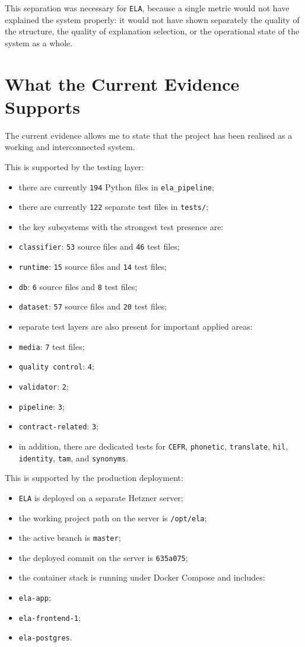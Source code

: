 \documentclass[12pt,a4paper,oneside]{report}
\begin{document}
This separation was necessary for \texttt{ELA}, because a single metric would not have explained the system properly: it would not have shown separately the quality of the structure, the quality of explanation selection, or the operational state of the system as a whole.

\section{What the Current Evidence Supports}
The current evidence allows me to state that the project has been realised as a working and interconnected system.

This is supported by the testing layer:
\begin{itemize}
  \item there are currently \texttt{194} Python files in \texttt{ela\_pipeline};
  \item there are currently \texttt{122} separate test files in \texttt{tests/};
  \item the key subsystems with the strongest test presence are:
  \item \texttt{classifier}: \texttt{53} source files and \texttt{46} test files;
  \item \texttt{runtime}: \texttt{15} source files and \texttt{14} test files;
  \item \texttt{db}: \texttt{6} source files and \texttt{8} test files;
  \item \texttt{dataset}: \texttt{57} source files and \texttt{20} test files;
  \item separate test layers are also present for important applied areas:
  \item \texttt{media}: \texttt{7} test files;
  \item \texttt{quality control}: \texttt{4};
  \item \texttt{validator}: \texttt{2};
  \item \texttt{pipeline}: \texttt{3};
  \item \texttt{contract-related}: \texttt{3};
  \item in addition, there are dedicated tests for \texttt{CEFR}, \texttt{phonetic}, \texttt{translate}, \texttt{hil}, \texttt{identity}, \texttt{tam}, and \texttt{synonyms}.
\end{itemize}

This is supported by the production deployment:
\begin{itemize}
  \item \texttt{ELA} is deployed on a separate Hetzner server;
  \item the working project path on the server is \texttt{/opt/ela};
  \item the active branch is \texttt{master};
  \item the deployed commit on the server is \texttt{635a075};
  \item the container stack is running under Docker Compose and includes:
  \item \texttt{ela-app};
  \item \texttt{ela-frontend-1};
  \item \texttt{ela-postgres}.
\end{itemize}
\end{document}

